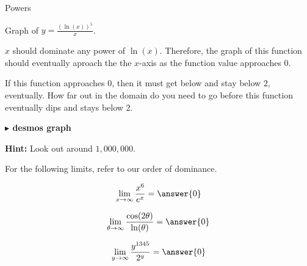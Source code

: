 \documentclass{ximera}
\begin{document}
\begin{example} Powers


Graph of $y = \frac{(\ln(x))^5}{x}$.

$x$ should dominate any power of $\ln(x)$.  Therefore, the graph of this function should eventually aproach the the $x$-axis as the function value approaches $0$. 


If this function approaches $0$, then it must get below and stay below $2$, eventually. How far out in the domain do you need to go before this function eventually dips and stays below $2$.





\begin{onlineOnly}
\textbf{\textcolor{blue!55!black}{$\blacktriangleright$ desmos graph}} 
\begin{center}
\end{center}
\end{onlineOnly}



\textbf{Hint:} Look out around $1,000,000$.

\end{example}







For the following limits, refer to our order of dominance.

\begin{question}

\[
\lim\limits_{x \to \infty} \frac{x^6}{e^x} = \answer{0}
\]

\end{question}









\begin{question}

\[
\lim\limits_{\theta \to \infty} \frac{\cos(2 \theta)}{\ln(\theta)} = \answer{0}
\]

\end{question}









\begin{question}

\[
\lim\limits_{y \to \infty} \frac{y^{1345}}{2^y} = \answer{0}
\]

\end{question}
\end{document}
